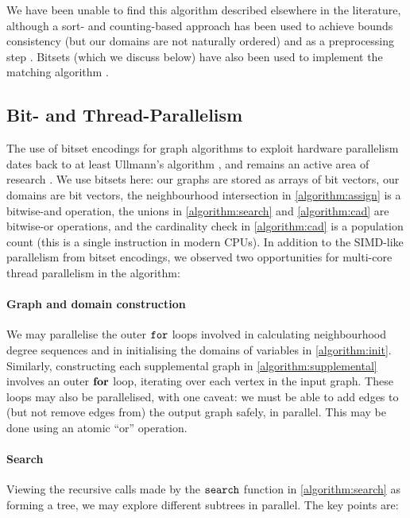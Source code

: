 \documentclass{llncs}
\begin{document}
We have been unable to find this algorithm described elsewhere in the literature, although a sort-
and counting-based approach has been used to achieve bounds consistency \cite{Puget:1998} (but our
domains are not naturally ordered) and as a preprocessing step \cite{Quimper:2005}. Bitsets (which
we discuss below) have also been used to implement the matching algorithm \cite{VanKessel:2012}.

\subsection{Bit- and Thread-Parallelism}

The use of bitset encodings for graph algorithms to exploit hardware parallelism dates back to at
least Ullmann's algorithm \cite{Ullmann:1976}, and remains an active area of research
\cite{SanSegundo:2007,Ullmann:2011}. We use bitsets here: our graphs are stored as arrays of bit
vectors, our domains are bit vectors, the neighbourhood intersection in \cref{algorithm:assign} is a
bitwise-and operation, the unions in \cref{algorithm:search} and \cref{algorithm:cad} are bitwise-or
operations, and the cardinality check in \cref{algorithm:cad} is a population count (this is a
single instruction in modern CPUs).  In addition to the SIMD-like parallelism from bitset encodings,
we observed two opportunities for multi-core thread parallelism in the algorithm:

\paragraph{Graph and domain construction} We may parallelise the outer $\FuncSty{for}$ loops
involved in calculating neighbourhood degree sequences and in initialising the domains of variables
in \cref{algorithm:init}.  Similarly, constructing each supplemental graph in
\cref{algorithm:supplemental} involves an outer $\KwSty{for}$ loop, iterating over each vertex in
the input graph. These loops may also be parallelised, with one caveat: we must be able to add edges
to (but not remove edges from) the output graph safely, in parallel. This may be done using an
atomic ``or'' operation.

\paragraph{Search} Viewing the recursive calls made by the $\FuncSty{search}$ function in
\cref{algorithm:search} as forming a tree, we may explore different subtrees in parallel. The key
points are:
\end{document}
